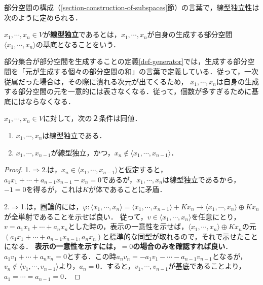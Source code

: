 \documentclass[uplatex, dvipdfmx]{jsreport}
\begin{document}
部分空間の構成（\ref{section-construction-of-subspaces}節）の言葉で，線型独立性は次のように定められる．
\begin{definition}\label{def-linear-independent}
    $x_1,\cdots,x_n\in V$が\textbf{線型独立}であるとは，$x_1,\cdots,x_n$が自身の生成する部分空間$\langle x_1,\cdots,x_n\rangle$の基底となることをいう．
\end{definition}
\begin{remark}
    部分集合が部分空間を生成することの定義\ref{def-generator}では，生成する部分空間を「元が生成する個々の部分空間の和」の言葉で定義している．従って，一次従属だった場合は，その際に潰れる次元が出てくるため，
    $x_1,\cdots,x_n$は自身の生成する部分空間の元を一意的には表さなくなる．従って，個数が多すぎるために基底にはならなくなる．
\end{remark}

\begin{proposition}\label{prop-linear-system-expansion}
    $x_1,\cdots,x_n\in V$に対して，次の２条件は同値．
    \begin{enumerate}
        \item $x_1,\cdots,x_n$は線型独立である．
        \item $x_1,\cdots,x_{n-1}$が線型独立，かつ，$x_n\notin\langle x_1,\cdots,x_{n-1}\rangle$．
    \end{enumerate}
\end{proposition}
\begin{proof}
    1.$\Rightarrow$2.は，$x_n\in\langle x_1,\cdots,x_{n-1}\rangle$と仮定すると，
    $a_1x_1+\cdots+a_{n-1}x_{n-1}-x_n=0$であるが，$x_1,\cdots,x_n$は線型独立であるから，$-1=0$を得るが，これは$K$が体であることに矛盾．

    2.$\Rightarrow$1.は，圏論的には，$\varphi:\langle x_1,\cdots,x_{n}\rangle=\langle x_1,\cdots,x_{n-1}\rangle+Kx_n\to\langle x_1,\cdots,x_n\rangle\oplus Kx_n$が全単射であることを示せば良い．
    従って，$v\in\langle x_1,\cdots,x_{n}\rangle$を任意にとり，$v=a_1x_1+\cdots+a_nx_n$とした時の，表示の一意性を示せば，$\langle x_1,\cdots,x_n\rangle\oplus Kx_n$の元$(a_1x_1+\cdots+a_{n-1}x_{n-1},a_nx_n)$と標準的な同型が取れるので，それで示せたことになる．
    \textbf{表示の一意性を示すには，$=0$の場合のみを確認すれば良い}．
    $a_1v_1+\cdots+a_nv_n=0$とする．この時$a_nv_n=-a_1v_1-\cdots-a_{n-1}v_{n-1}$となるが，$v_n\notin\langle v_1,\cdots,v_{n-1}\rangle$より，$a_n=0$．すると，$v_1,\cdots,v_{n-1}$が基底であることより，$a_1=\cdots=a_{n-1}=0$．
\end{proof}
\end{document}
